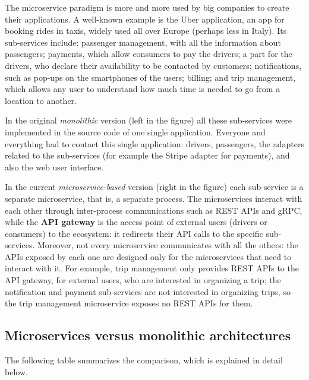 The microservice paradigm is more and more used by big companies to create their applications. A well-known example is the Uber application, an app for booking rides in taxis, widely used all over Europe (perhaps less in Italy). Its sub-services include: passenger management, with all the information about passengers; payments, which allow consumers to pay the drivers; a part for the drivers, who declare their availability to be contacted by customers; notifications, such as pop-ups on the smartphones of the users; billing; and trip management, which allows any user to understand how much time is needed to go from a location to another.

\begin{center}
\end{center}

In the original \emph{monolithic} version (left in the figure) all these sub-services were implemented in the source code of one single application. Everyone and everything had to contact this single application: drivers, passengers, the adapters related to the sub-services (for example the Stripe adapter for payments), and also the web user interface.

In the current \emph{microservice-based} version (right in the figure) each sub-service is a separate microservice, that is, a separate process. The microservices interact with each other through inter-process communications such as REST APIs and gRPC, while the \textbf{API gateway} is the access point of external users (drivers or consumers) to the ecosystem: it redirects their API calls to the specific sub-services. Moreover, not every microservice communicates with all the others: the APIs exposed by each one are designed only for the microservices that need to interact with it. For example, trip management only provides REST APIs to the API gateway, for external users, who are interested in organizing a trip; the notification and payment sub-services are not interested in organizing trips, so the trip management microservice exposes no REST APIs for them.

\subsection{Microservices versus monolithic architectures}

The following table summarizes the comparison, which is explained in detail below.


